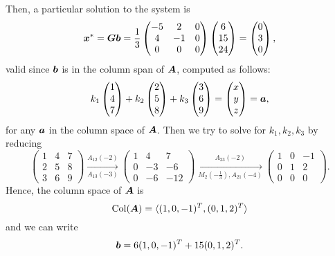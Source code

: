 \documentclass{report}
\DeclareMathOperator{\Col}{Col}
\begin{document}
{	Then, a particular solution to the system is 
	$$\boldsymbol{x}^*=\boldsymbol{G}\boldsymbol{b}=\frac{1}{3}\begin{pmatrix}
		-5 & 2 & 0 \\ 4 & -1 & 0 \\ 0 & 0 & 0 
	\end{pmatrix}\begin{pmatrix}
	6 \\ 15 \\ 24
	\end{pmatrix}=\begin{pmatrix}
	0 \\ 3 \\ 0
	\end{pmatrix},$$
	valid since $\boldsymbol{b}$ is in the column span of $\boldsymbol{A}$, computed as follows:
	$$k_1\begin{pmatrix}
		1 \\ 4 \\ 7
	\end{pmatrix}+k_2\begin{pmatrix}
	2 \\ 5 \\ 8
	\end{pmatrix}+k_3\begin{pmatrix}
	3 \\ 6 \\ 9
	\end{pmatrix}=\begin{pmatrix}
	x \\ y \\ z
	\end{pmatrix}=\boldsymbol{a},$$
	for any $\boldsymbol{a}$ in the column space of $\boldsymbol{A}$. Then we try to solve for $k_1,k_2,k_3$ by reducing
	$$\begin{pmatrix}
		1 & 4 & 7 \\ 2 & 5 & 8 \\ 3 & 6 & 9
	\end{pmatrix}\xrightarrow[A_{13}(-3)]{A_{12}(-2)}\begin{pmatrix}
	1 & 4 & 7 \\ 0 & -3 & -6 \\ 0 & -6 & -12
	\end{pmatrix}\xrightarrow[M_2(-\frac{1}{3}), A_{21}(-4)]{A_{23}(-2)}\begin{pmatrix}
	1 & 0 & -1 \\ 0 & 1 & 2 \\ 0 & 0 & 0
	\end{pmatrix}.$$
	Hence, the column space of $\boldsymbol{A}$ is 
	$$\Col(\bmA)=\lsp(1,0,-1)^T,(0,1,2)^T\rsp$$
	and we can write 
	$$\boldsymbol{b}=6(1,0,-1)^T+15(0,1,2)^T.$$
	}
\end{document}
